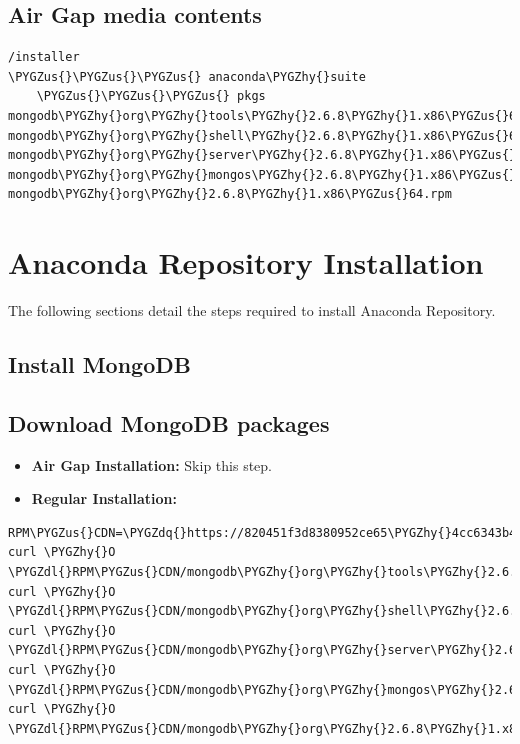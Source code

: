 \documentclass[letterpaper,10pt,openany,oneside]{sphinxmanual}
\def\PYGZus{\char`\_}
\def\PYGZdl{\char`\$}
\def\PYGZhy{\char`\-}
\def\PYGZdq{\char`\"}
\begin{document}
\subsection{Air Gap media contents}
\label{AnacondaRepository:air-gap-media-contents}
\begin{Verbatim}[commandchars=\\\{\}]
/installer
\PYGZus{}\PYGZus{}\PYGZus{} anaconda\PYGZhy{}suite
    \PYGZus{}\PYGZus{}\PYGZus{} pkgs
mongodb\PYGZhy{}org\PYGZhy{}tools\PYGZhy{}2.6.8\PYGZhy{}1.x86\PYGZus{}64.rpm
mongodb\PYGZhy{}org\PYGZhy{}shell\PYGZhy{}2.6.8\PYGZhy{}1.x86\PYGZus{}64.rpm
mongodb\PYGZhy{}org\PYGZhy{}server\PYGZhy{}2.6.8\PYGZhy{}1.x86\PYGZus{}64.rpm
mongodb\PYGZhy{}org\PYGZhy{}mongos\PYGZhy{}2.6.8\PYGZhy{}1.x86\PYGZus{}64.rpm
mongodb\PYGZhy{}org\PYGZhy{}2.6.8\PYGZhy{}1.x86\PYGZus{}64.rpm
\end{Verbatim}


\section{Anaconda Repository Installation}
\label{AnacondaRepository:anaconda-repository-installation}
The following sections detail the steps required to install Anaconda
Repository.


\subsection{Install MongoDB}
\label{AnacondaRepository:install-mongodb}

\subsection{Download MongoDB packages}
\label{AnacondaRepository:download-mongodb-packages}\begin{itemize}
\item {} 
\textbf{Air Gap Installation:} Skip this step.

\item {} 
\textbf{Regular Installation:}

\end{itemize}

\begin{Verbatim}[commandchars=\\\{\}]
RPM\PYGZus{}CDN=\PYGZdq{}https://820451f3d8380952ce65\PYGZhy{}4cc6343b423784e82fd202bb87cf87cf.ssl.cf1.rackcdn.com\PYGZdq{}
curl \PYGZhy{}O \PYGZdl{}RPM\PYGZus{}CDN/mongodb\PYGZhy{}org\PYGZhy{}tools\PYGZhy{}2.6.8\PYGZhy{}1.x86\PYGZus{}64.rpm
curl \PYGZhy{}O \PYGZdl{}RPM\PYGZus{}CDN/mongodb\PYGZhy{}org\PYGZhy{}shell\PYGZhy{}2.6.8\PYGZhy{}1.x86\PYGZus{}64.rpm
curl \PYGZhy{}O \PYGZdl{}RPM\PYGZus{}CDN/mongodb\PYGZhy{}org\PYGZhy{}server\PYGZhy{}2.6.8\PYGZhy{}1.x86\PYGZus{}64.rpm
curl \PYGZhy{}O \PYGZdl{}RPM\PYGZus{}CDN/mongodb\PYGZhy{}org\PYGZhy{}mongos\PYGZhy{}2.6.8\PYGZhy{}1.x86\PYGZus{}64.rpm
curl \PYGZhy{}O \PYGZdl{}RPM\PYGZus{}CDN/mongodb\PYGZhy{}org\PYGZhy{}2.6.8\PYGZhy{}1.x86\PYGZus{}64.rpm
\end{Verbatim}
\end{document}
